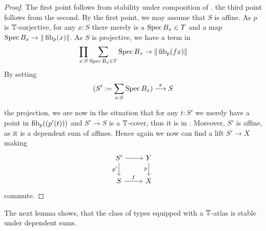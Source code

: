 \begin{proof}
	The first point follows from stability under composition of \Cov. %
	the third point follows from the second. 
	By the first point, we may assume that $S$ is affine.
	As $p$ is $\mathbb{T}$-surjective, for any $x : S$ there merely is a $\operatorname{Spec} B_x \in T$  and a map $\operatorname{Spec} B_x \to \| \operatorname{fib}_p (x) \| $. 
	As $S$ is projective, we have a term in
	\[\prod_{x : S} \sum_{\operatorname{Spec} B_x \in T} \operatorname{Spec} B_x \to \| \operatorname{fib}_p (f x)\| \]
	By setting 
	\[(S' := \sum_{x : S} \operatorname{Spec} B_x) \overset{\pi}{\longrightarrow} S \]
	
	the projection, we are now in the situation that for any $t : S'$ we merely have a point in $\operatorname{fib}_p((p'(t)))$ and $S' \to S$ is a $\mathbb{T}$-cover, thus it is in \Cov. Moreover, $S'$ is affine, as it is a dependent sum of affines. Hence again we now can find a lift $S' \to X$ %
	making
\[\begin{tikzcd}
	{S'} & Y \\
	S & X
	\arrow[from=1-1, to=1-2]
	\arrow["{p'}"', from=1-1, to=2-1]
	\arrow["p"', from=1-2, to=2-2]
	\arrow["f", from=2-1, to=2-2]
\end{tikzcd}\]	commute. %
\end{proof}
The next lemma shows, that the class of types equipped with a $\mathbb{T}$-atlas is stable under dependent sums.

